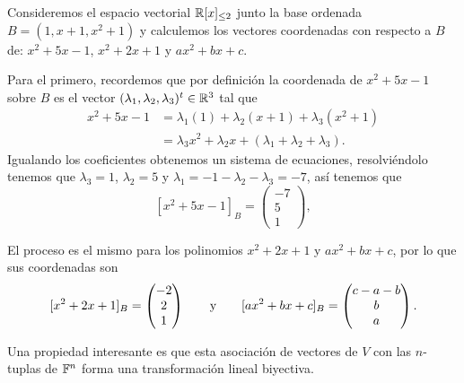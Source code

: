 \begin{example}
  Consideremos el espacio vectorial $\mathbb{R}[x]_{\leq 2}$ junto la base ordenada $B = (1, x+1, x^2+1)$ y calculemos los vectores coordenadas con respecto a $B$ de: $x^2+5x-1$, $x^2 + 2x+1$ y $ax^2 + bx + c$.

  \examplesolution 
  Para el primero, recordemos que por definición la coordenada de $x^2+5x-1$ sobre $B$ es el vector $(\lambda_1, \lambda_2, \lambda_3)^t \in \mathbb{R}^3$ tal que
    \begin{align*}
      x^2+5x-1 &= \lambda_1 (1) + \lambda_2(x+1) + \lambda_3(x^2+1) \\
        &= \lambda_3 x^2 + \lambda_2x + (\lambda_1 + \lambda_2 + \lambda_3).
    \end{align*}  
    Igualando los coeficientes obtenemos un sistema de ecuaciones, resolviéndolo tenemos que $\lambda_3 = 1$, $\lambda_2 = 5$ y $\lambda_1 = -1 - \lambda_2 - \lambda_3 = -7$, así tenemos que
      \[
        [x^2+5x-1]_B = \begin{pmatrix} -7 \\ 5 \\ 1 \end{pmatrix},
      \]
    
    El proceso es el mismo para los polinomios $x^2 + 2x+1$ y $ax^2 + bx + c$, por lo que sus coordenadas son
    \[
        [x^2+2x+1]_B = \begin{pmatrix} -2 \\ 2 \\ 1 \end{pmatrix}
          \qquad\text{y}\qquad
        [ax^2+bx+c]_B = \begin{pmatrix} c-a-b \\b \\ a \end{pmatrix}.
      \]
\end{example}

Una propiedad interesante es que esta asociación de vectores de $V$ con las $n$-tuplas de $\mathbb{F}^n$ forma una transformación lineal biyectiva.

